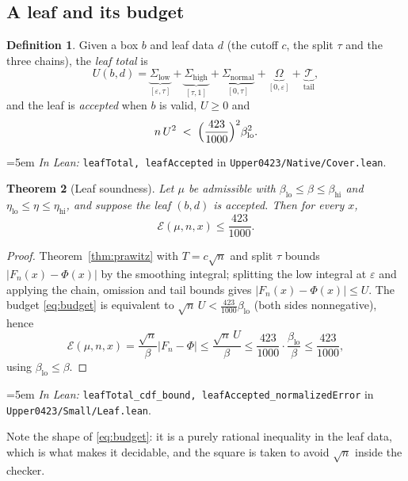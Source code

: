 \documentclass[11pt,a4paper]{article}
\newtheorem{theorem}{Theorem}[section]
\theoremstyle{definition}
\newtheorem{definition}[theorem]{Definition}
\newcommand{\Lean}[1]{\texttt{#1}}
\newcommand{\file}[1]{\texttt{#1}}
\newcommand{\formal}[2]{%
  \par\smallskip
  \begingroup\small\raggedright\emergencystretch=5em
  \noindent\textit{In Lean:} \Lean{#1} in \file{#2}.\par
  \endgroup\smallskip}
\begin{document}
\subsection{A leaf and its budget}

\begin{definition}
  \label{def:leaf}
  Given a box $b$ and leaf data $d$ (the cutoff $c$, the split $\tau$ and the
  three chains), the \emph{leaf total} is
  \[
    U(b,d)=\underbrace{\Sigma_{\text{low}}}_{[\varepsilon,\tau]}
    +\underbrace{\Sigma_{\text{high}}}_{[\tau,1]}
    +\underbrace{\Sigma_{\text{normal}}}_{[0,\tau]}
    +\underbrace{\Omega}_{[0,\varepsilon]}
    +\underbrace{\mathcal T}_{\text{tail}} ,
  \]
  and the leaf is \emph{accepted} when $b$ is valid, $U\ge0$ and
  \begin{equation}
    \label{eq:budget}
    n\,U^2 \;<\; \Bigl(\frac{423}{1000}\Bigr)^2\beta_{\mathrm{lo}}^2 .
  \end{equation}
\end{definition}
\formal{leafTotal, leafAccepted}{Upper0423/Native/Cover.lean}

\begin{theorem}[Leaf soundness]
  \label{thm:leaf}
  Let $\mu$ be admissible with $\beta_{\mathrm{lo}}\le\beta\le\beta_{\mathrm{hi}}$
  and $\eta_{\mathrm{lo}}\le\eta\le\eta_{\mathrm{hi}}$, and suppose the leaf
  $(b,d)$ is accepted. Then for every $x$,
  \[
    \mathcal E(\mu,n,x)\le\frac{423}{1000} .
  \]
\end{theorem}
\begin{proof}
  Theorem~\ref{thm:prawitz} with $T=c\sqrt n$ and split $\tau$ bounds
  $|F_n(x)-\Phi(x)|$ by the smoothing integral; splitting the low integral at
  $\varepsilon$ and applying the chain, omission and tail bounds gives
  $|F_n(x)-\Phi(x)|\le U$. The budget \eqref{eq:budget} is equivalent to
  $\sqrt n\,U<\tfrac{423}{1000}\beta_{\mathrm{lo}}$ (both sides nonnegative),
  hence
  \[
    \mathcal E(\mu,n,x)=\frac{\sqrt n}{\beta}|F_n-\Phi|
    \le\frac{\sqrt n\,U}{\beta}
    \le\frac{423}{1000}\cdot\frac{\beta_{\mathrm{lo}}}{\beta}
    \le\frac{423}{1000},
  \]
  using $\beta_{\mathrm{lo}}\le\beta$.
\end{proof}
\formal{leafTotal\_cdf\_bound, leafAccepted\_normalizedError}{Upper0423/Small/Leaf.lean}

Note the shape of \eqref{eq:budget}: it is a purely rational inequality in the
leaf data, which is what makes it decidable, and the square is taken to avoid
$\sqrt n$ inside the checker.
\end{document}
